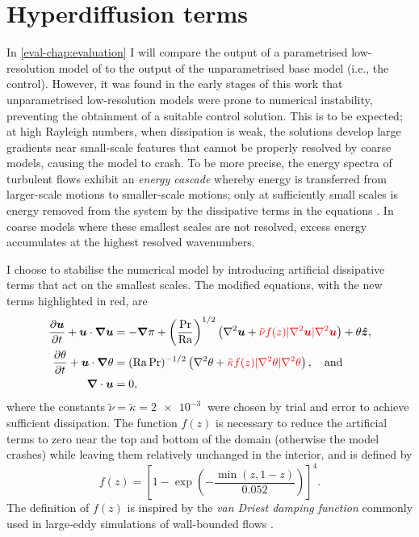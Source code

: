 \documentclass[../main.tex]{subfiles}
\begin{document}
\section{Hyperdiffusion terms} \label{sec:hyper}
In \cref{eval-chap:evaluation} I will compare the output of a parametrised
low-resolution model of  to the
output of the unparametrised base model (i.e., the control). However, it was
found in the early stages of this work that unparametrised low-resolution
models were prone to numerical instability, preventing the obtainment of a
suitable control solution. This is to be expected; at high Rayleigh numbers,
when dissipation is weak, the solutions develop large gradients near
small-scale features that cannot be properly resolved by coarse models, causing
the model to crash. To be more precise, the energy spectra of turbulent flows
exhibit an \emph{energy cascade} whereby energy is transferred from
larger-scale motions to smaller-scale motions; only at sufficiently small
scales is energy removed from the system by the dissipative terms in the
equations \parencite{pope2000}. In coarse models where these smallest scales
are not resolved, excess energy accumulates at the highest resolved
wavenumbers.

I choose to stabilise the numerical model by introducing artificial dissipative
terms that act on the smallest scales. The modified equations, with the new
terms highlighted in red, are
\begin{align}
    \label{eqn:hyper_momentum}
    \frac{\partial \bm{u}}{\partial t} + \bm{u} \cdot \bm{\nabla} \bm{u}
        &= -\bm{\nabla} \pi + \left( \frac{\mathrm{Pr}}{\mathrm{Ra}}\right)^{1/2}
            \left(
                \nabla^2 \bm{u} + {\color{red}
                \tilde{\nu} f(z) |\nabla^2 \bm{u}| \nabla^2 \bm{u}}
            \right)
            + \theta \bm{\hat{z}}, \\
    \label{eqn:hyper_energy}
    \frac{\partial \theta}{\partial t} + \bm{u} \cdot \bm{\nabla} \theta
        &= (\mathrm{Ra}\,\mathrm{Pr})^{-1/2}
            \left(
                \nabla^2 \theta + {\color{red}
                \tilde{\kappa} f(z) |\nabla^2 \theta| \nabla^2 \theta}
            \right), \quad \text{and} \\
    \label{eqn:hyper_incompressible}
    \bm{\nabla} \cdot \bm{u} &= 0,
\end{align}
where the constants $\tilde{\nu} = \tilde{\kappa} = \SI{2e-3}{}$ were chosen by
trial and error to achieve sufficient dissipation. The function $f(z)$ is
necessary to reduce the artificial terms to zero near the top and bottom of the
domain (otherwise the model crashes) while leaving them relatively unchanged
in the interior, and is defined by
\[
    f(z) = \left[
        1 - \exp \left( -\frac{\min(z, 1-z)}{0.052} \right)
    \right]^4.
\]
The definition of $f(z)$ is inspired by the \emph{van Driest damping function}
commonly used in large-eddy simulations of wall-bounded flows
\parencite{pope2000}.
\end{document}
